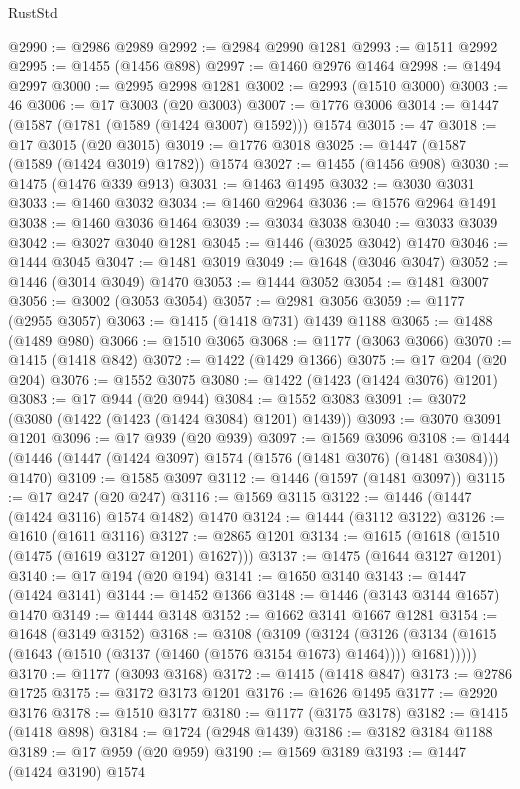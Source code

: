 \begin{lexlean}{RustStd}
\begin{coremodule}
@2990 := @2986 @2989
@2992 := @2984 @2990 @1281
@2993 := @1511 @2992
@2995 := @1455 (@1456 @898)
@2997 := @1460 @2976 @1464
@2998 := @1494 @2997
@3000 := @2995 @2998 @1281
@3002 := @2993 (@1510 @3000)
@3003 := 46
@3006 := @17 @3003 (@20 @3003)
@3007 := @1776 @3006
@3014 := @1447 (@1587 (@1781 (@1589 (@1424 @3007) @1592))) @1574
@3015 := 47
@3018 := @17 @3015 (@20 @3015)
@3019 := @1776 @3018
@3025 := @1447 (@1587 (@1589 (@1424 @3019) @1782)) @1574
@3027 := @1455 (@1456 @908)
@3030 := @1475 (@1476 @339 @913)
@3031 := @1463 @1495
@3032 := @3030 @3031
@3033 := @1460 @3032
@3034 := @1460 @2964
@3036 := @1576 @2964 @1491
@3038 := @1460 @3036 @1464
@3039 := @3034 @3038
@3040 := @3033 @3039
@3042 := @3027 @3040 @1281
@3045 := @1446 (@3025 @3042) @1470
@3046 := @1444 @3045
@3047 := @1481 @3019
@3049 := @1648 (@3046 @3047)
@3052 := @1446 (@3014 @3049) @1470
@3053 := @1444 @3052
@3054 := @1481 @3007
@3056 := @3002 (@3053 @3054)
@3057 := @2981 @3056
@3059 := @1177 (@2955 @3057)
@3063 := @1415 (@1418 @731) @1439 @1188
@3065 := @1488 (@1489 @980)
@3066 := @1510 @3065
@3068 := @1177 (@3063 @3066)
@3070 := @1415 (@1418 @842)
@3072 := @1422 (@1429 @1366)
@3075 := @17 @204 (@20 @204)
@3076 := @1552 @3075
@3080 := @1422 (@1423 (@1424 @3076) @1201)
@3083 := @17 @944 (@20 @944)
@3084 := @1552 @3083
@3091 := @3072 (@3080 (@1422 (@1423 (@1424 @3084) @1201) @1439))
@3093 := @3070 @3091 @1201
@3096 := @17 @939 (@20 @939)
@3097 := @1569 @3096
@3108 := @1444 (@1446 (@1447 (@1424 @3097) @1574 (@1576 (@1481 @3076) (@1481 @3084))) @1470)
@3109 := @1585 @3097
@3112 := @1446 (@1597 (@1481 @3097))
@3115 := @17 @247 (@20 @247)
@3116 := @1569 @3115
@3122 := @1446 (@1447 (@1424 @3116) @1574 @1482) @1470
@3124 := @1444 (@3112 @3122)
@3126 := @1610 (@1611 @3116)
@3127 := @2865 @1201
@3134 := @1615 (@1618 (@1510 (@1475 (@1619 @3127 @1201) @1627)))
@3137 := @1475 (@1644 @3127 @1201)
@3140 := @17 @194 (@20 @194)
@3141 := @1650 @3140
@3143 := @1447 (@1424 @3141)
@3144 := @1452 @1366
@3148 := @1446 (@3143 @3144 @1657) @1470
@3149 := @1444 @3148
@3152 := @1662 @3141 @1667 @1281
@3154 := @1648 (@3149 @3152)
@3168 := @3108
    (@3109
      (@3124
        (@3126 (@3134 (@1615 (@1643 (@1510 (@3137 (@1460 (@1576 @3154 @1673) @1464)))) @1681)))))
@3170 := @1177 (@3093 @3168)
@3172 := @1415 (@1418 @847)
@3173 := @2786 @1725
@3175 := @3172 @3173 @1201
@3176 := @1626 @1495
@3177 := @2920 @3176
@3178 := @1510 @3177
@3180 := @1177 (@3175 @3178)
@3182 := @1415 (@1418 @898)
@3184 := @1724 (@2948 @1439)
@3186 := @3182 @3184 @1188
@3189 := @17 @959 (@20 @959)
@3190 := @1569 @3189
@3193 := @1447 (@1424 @3190) @1574

\end{coremodule}
\end{lexlean}
